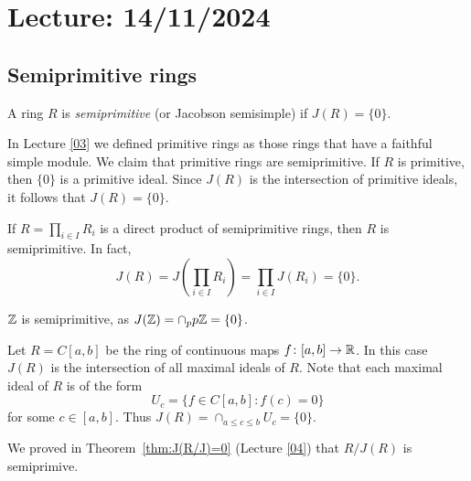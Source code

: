 \section{Lecture: 14/11/2024}



\subsection{Semiprimitive rings}

\begin{definition}
	A ring $R$ is \emph{semiprimitive} (or Jacobson semisimple) if  $J(R)=\{0\}$.
\end{definition}

In Lecture \ref{03} we defined primitive rings as
those rings that have a faithful simple module.  We claim that primitive rings
are semiprimitive. If $R$ is primitive, then $\{0\}$ is a primitive ideal. Since
$J(R)$ is the intersection of primitive ideals, it follows that $J(R)=\{0\}$.

\begin{example}
	If $R=\prod_{i\in I}R_i$ is a direct product of semiprimitive rings, then
	$R$ is semiprimitive. In fact, 
	\[
		J(R)=J\left(\prod_{i\in I}R_i\right)=\prod_{i\in I}J(R_i)=\{0\}.
	\]
\end{example}

\begin{example}
$\mathbb{Z}$ is semiprimitive, as $J(\mathbb{Z})=\cap_{p}p\mathbb{Z}=\{0\}$.
\end{example}

\begin{example}
	\label{exa:C[a,b]}
	Let $R=C[a,b]$ be the ring of continuous maps $f\colon [a,b]\to\mathbb{R}$. 
	In this case $J(R)$ is the intersection of all maximal ideals of $R$. Note that 
	each maximal ideal of $R$ is of the form 
	\[
		U_c=\{f\in C[a,b]:f(c)=0\}
	\]
	for some $c\in[a,b]$. 
	Thus $J(R)=\cap_{a\leq c\leq
	b}U_c=\{0\}$.
\end{example}

We proved in Theorem~\ref{thm:J(R/J)=0} (Lecture \ref{04}) 
that $R/J(R)$ is semiprimive. 

%
%


